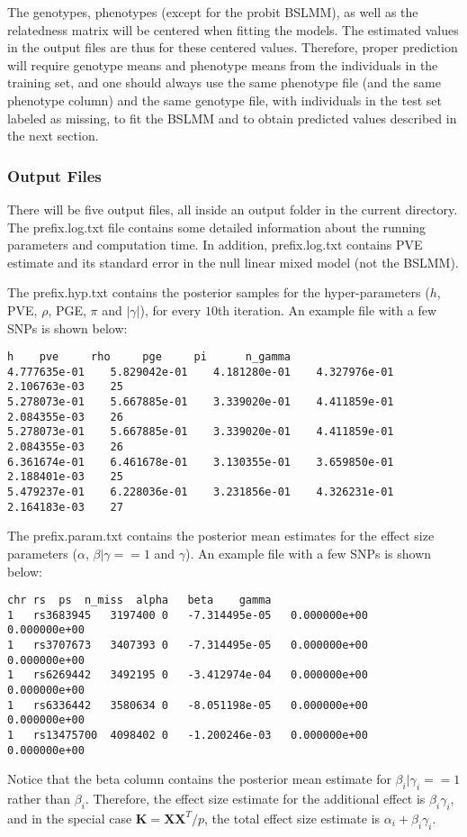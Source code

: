 \documentclass[11pt]{article}
\newcommand{\bK}{\mathbf{K}}
\newcommand{\bX}{\mathbf{X}}
\begin{document}
The genotypes, phenotypes (except for the probit BSLMM), as well as the relatedness matrix will be centered when fitting the models. The estimated values in the output files are thus for these centered values. Therefore, proper prediction will require genotype means and phenotype means from the individuals in the training set, and one should always use the same phenotype file (and the same phenotype column) and the same genotype file, with individuals in the test set labeled as missing, to fit the BSLMM and to obtain predicted values described in the next section. 



\subsubsection{Output Files}
There will be five output files, all inside an output folder in the current directory. The prefix.log.txt file contains some detailed information about the running parameters and computation time. In addition, prefix.log.txt contains PVE estimate and its standard error in the null linear mixed model (not the BSLMM).

The prefix.hyp.txt contains the posterior samples for the hyper-parameters ($h$, PVE, $\rho$, PGE, $\pi$ and $|\gamma|$), for every $10$th iteration. An example file with a few SNPs is shown below:
%
\begin{verbatim}
h 	 pve 	 rho 	 pge 	 pi 	 n_gamma
4.777635e-01	5.829042e-01	4.181280e-01	4.327976e-01	2.106763e-03	25	
5.278073e-01	5.667885e-01	3.339020e-01	4.411859e-01	2.084355e-03	26	
5.278073e-01	5.667885e-01	3.339020e-01	4.411859e-01	2.084355e-03	26	
6.361674e-01	6.461678e-01	3.130355e-01	3.659850e-01	2.188401e-03	25	
5.479237e-01	6.228036e-01	3.231856e-01	4.326231e-01	2.164183e-03	27
\end{verbatim}
%
The prefix.param.txt contains the posterior mean estimates for the effect size parameters ($\alpha$, $\beta | \gamma==1$ and $\gamma$). An example file with a few SNPs is shown below:
%
\begin{verbatim}
chr	rs	ps	n_miss	alpha	beta	gamma
1	rs3683945	3197400	0	-7.314495e-05	0.000000e+00	0.000000e+00
1	rs3707673	3407393	0	-7.314495e-05	0.000000e+00	0.000000e+00
1	rs6269442	3492195	0	-3.412974e-04	0.000000e+00	0.000000e+00
1	rs6336442	3580634	0	-8.051198e-05	0.000000e+00	0.000000e+00
1	rs13475700	4098402	0	-1.200246e-03	0.000000e+00	0.000000e+00
\end{verbatim}
%
Notice that the beta column contains the posterior mean estimate for $\beta_i | \gamma_i==1$ rather than $\beta_i$. Therefore, the effect size estimate for the additional effect is $\beta_i\gamma_i$, and in the special case $\bK=\bX\bX^T/p$, the total effect size estimate is $\alpha_i+\beta_i\gamma_i$.
\end{document}
